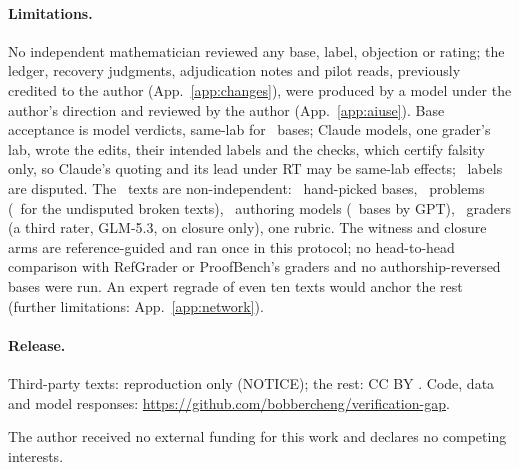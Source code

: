 \documentclass{article}
\begin{document}
\paragraph{Limitations.} No independent mathematician reviewed any base, label, objection or rating; the ledger, recovery judgments, adjudication notes and pilot reads, previously credited to the author (App.~\ref{app:changes}), were produced by a model under the author's direction and reviewed by the author (App.~\ref{app:aiuse}). Base acceptance is model verdicts, same-lab for \CRBasesSameLabWord\ bases; Claude models, one grader's lab, wrote the edits, their intended labels and the checks, which certify falsity only, so Claude's quoting and its lead under RT may be same-lab effects; \CRNDisputedWord\ labels are disputed. The \CRNTexts\ texts are non-independent: \CRNBases\ hand-picked bases, \CRNProblemsCoveredWord\ problems (\CRExclProblems\ for the undisputed broken texts), \CRNAuthorModels\ authoring models (\CRBasesGPTWord\ bases by GPT), \CRNGraders\ graders (a third rater, GLM-5.3, on closure only), one rubric. The witness and closure arms are reference-guided and ran once in this protocol; no head-to-head comparison with RefGrader or ProofBench's graders and no authorship-reversed bases were run. An expert regrade of even ten texts would anchor the rest (further limitations: App.~\ref{app:network}).

\paragraph{Release.} Third-party texts: reproduction only (NOTICE); the rest: CC BY . Code, data and model responses: \mbox{\url{https://github.com/bobbercheng/verification-gap}}.

\begin{ack}
The author received no external funding for this work and declares no competing interests.
\end{ack}





\end{document}
